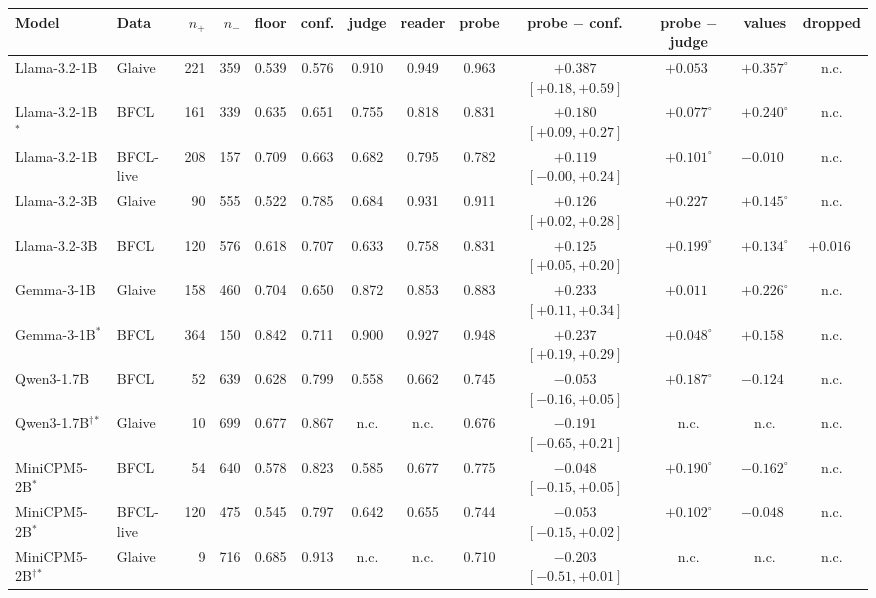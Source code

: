\begin{tabular}{@{}llrrccccccccc@{}}
\toprule
Model & Data & $n_+$ & $n_-$ & floor & conf. & judge & reader & probe & probe $-$ conf. & probe $-$ judge & values & dropped \\
\midrule
Llama-3.2-1B & Glaive & 221 & 359 & 0.539 & 0.576 & 0.910 & 0.949 & 0.963 & $+0.387$ {\scriptsize$[+0.18, +0.59]$} & $+0.053^{\phantom{\circ}}$ & $+0.357^{\circ}$ & n.c. \\
Llama-3.2-1B$^{*}$ & BFCL & 161 & 339 & 0.635 & 0.651 & 0.755 & 0.818 & 0.831 & $+0.180$ {\scriptsize$[+0.09, +0.27]$} & $+0.077^{\circ}$ & $+0.240^{\circ}$ & n.c. \\
Llama-3.2-1B & BFCL-live & 208 & 157 & 0.709 & 0.663 & 0.682 & 0.795 & 0.782 & $+0.119$ {\scriptsize$[-0.00, +0.24]$} & $+0.101^{\circ}$ & $-0.010^{\phantom{\circ}}$ & n.c. \\
Llama-3.2-3B & Glaive & 90 & 555 & 0.522 & 0.785 & 0.684 & 0.931 & 0.911 & $+0.126$ {\scriptsize$[+0.02, +0.28]$} & $+0.227^{\phantom{\circ}}$ & $+0.145^{\circ}$ & n.c. \\
Llama-3.2-3B & BFCL & 120 & 576 & 0.618 & 0.707 & 0.633 & 0.758 & 0.831 & $+0.125$ {\scriptsize$[+0.05, +0.20]$} & $+0.199^{\circ}$ & $+0.134^{\circ}$ & $+0.016^{\phantom{\circ}}$ \\
Gemma-3-1B & Glaive & 158 & 460 & 0.704 & 0.650 & 0.872 & 0.853 & 0.883 & $+0.233$ {\scriptsize$[+0.11, +0.34]$} & $+0.011^{\phantom{\circ}}$ & $+0.226^{\circ}$ & n.c. \\
Gemma-3-1B$^{*}$ & BFCL & 364 & 150 & 0.842 & 0.711 & 0.900 & 0.927 & 0.948 & $+0.237$ {\scriptsize$[+0.19, +0.29]$} & $+0.048^{\circ}$ & $+0.158^{\phantom{\circ}}$ & n.c. \\
\midrule
Qwen3-1.7B & BFCL & 52 & 639 & 0.628 & 0.799 & 0.558 & 0.662 & 0.745 & $-0.053$ {\scriptsize$[-0.16, +0.05]$} & $+0.187^{\circ}$ & $-0.124^{\phantom{\circ}}$ & n.c. \\
Qwen3-1.7B$^\dagger$$^{*}$ & Glaive & 10 & 699 & 0.677 & 0.867 & n.c. & n.c. & 0.676 & $-0.191$ {\scriptsize$[-0.65, +0.21]$} & n.c. & n.c. & n.c. \\
MiniCPM5-2B$^{*}$ & BFCL & 54 & 640 & 0.578 & 0.823 & 0.585 & 0.677 & 0.775 & $-0.048$ {\scriptsize$[-0.15, +0.05]$} & $+0.190^{\circ}$ & $-0.162^{\circ}$ & n.c. \\
MiniCPM5-2B$^{*}$ & BFCL-live & 120 & 475 & 0.545 & 0.797 & 0.642 & 0.655 & 0.744 & $-0.053$ {\scriptsize$[-0.15, +0.02]$} & $+0.102^{\circ}$ & $-0.048^{\phantom{\circ}}$ & n.c. \\
MiniCPM5-2B$^\dagger$$^{*}$ & Glaive & 9 & 716 & 0.685 & 0.913 & n.c. & n.c. & 0.710 & $-0.203$ {\scriptsize$[-0.51, +0.01]$} & n.c. & n.c. & n.c. \\

\end{tabular}
